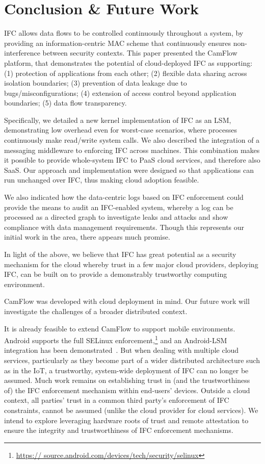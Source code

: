 \documentclass[10pt,journal,compsoc]{IEEEtran}
\begin{document}
 
\section{Conclusion \& Future Work}
\label{sec:conclusion}




IFC  allows data flows to be controlled continuously throughout a system, by providing an information-centric MAC scheme that continuously ensures non-interference between security contexts.
This paper presented the CamFlow platform, that demonstrates the potential of cloud-deployed IFC as supporting: 
(1) protection of applications from each other; 
(2) flexible data sharing across isolation boundaries;
(3) prevention of data leakage due to bugs/misconfigurations;
(4) extension of access control beyond application boundaries;
(5) data flow transparency.


Specifically, we detailed a new kernel implementation of IFC as an LSM, demonstrating low overhead even for worst-case scenarios, where processes continuously make read/write system calls.  We also described the integration of a messaging middleware to enforcing IFC across machines.
This combination makes it possible to provide whole-system IFC to PaaS cloud services, and therefore also SaaS.
Our approach and implementation were designed so that applications can run unchanged over IFC, thus making cloud adoption feasible.

We also indicated how the data-centric logs based on IFC enforcement could provide the means to audit an IFC-enabled system, whereby a log can be processed as a directed graph to investigate leaks and attacks and show compliance with data management requirements. Though this represents our initial work in the area, there appears much promise. 

In light of the above, we believe that IFC has great potential as a security mechanism for the cloud whereby trust in a few major cloud providers, deploying IFC, can be built on to provide a demonstrably trustworthy computing environment.

CamFlow was developed with cloud deployment in mind. 
Our future work will investigate the challenges of a broader distributed context.


It is already feasible to extend CamFlow to support mobile environments. Android 
supports the full SELinux enforcement,\footnote{\url{https://
source.android.com/devices/tech/security/selinux}} and  an 
Android-LSM integration has been demonstrated~\cite{smalley2013security}.
But when dealing with multiple cloud services, particularly as they become part of a wider distributed architecture such as in the IoT, a trustworthy, system-wide deployment of IFC can no longer be assumed.
Much work remains on establishing trust in (and the trustworthiness of) the IFC enforcement mechanism within end-users' devices.
Outside a cloud context, all parties' trust in a common third party's enforcement of IFC constraints, cannot be assumed (unlike the cloud provider for cloud services).
We intend to explore leveraging hardware roots of trust and remote attestation to ensure the integrity and trustworthiness of IFC enforcement mechanisms.
\end{document}
